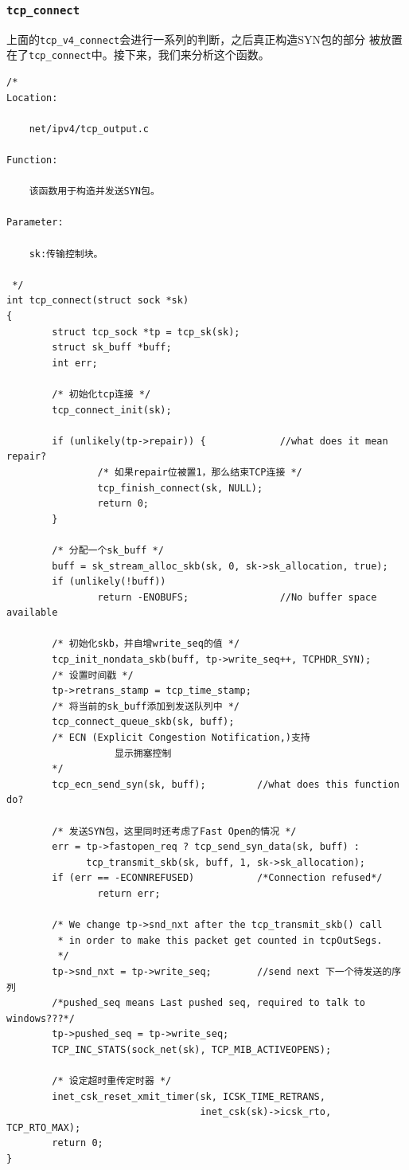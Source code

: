         \subsubsection{\texttt{tcp_connect}}
            上面的\texttt{tcp_v4_connect}会进行一系列的判断，之后真正构造SYN包的部分
            被放置在了\texttt{tcp_connect}中。接下来，我们来分析这个函数。

\begin{verbatim}
/* 
Location:

    net/ipv4/tcp_output.c

Function:

    该函数用于构造并发送SYN包。

Parameter:

    sk:传输控制块。

 */
int tcp_connect(struct sock *sk)
{
        struct tcp_sock *tp = tcp_sk(sk);
        struct sk_buff *buff;
        int err;

        /* 初始化tcp连接 */
        tcp_connect_init(sk);

        if (unlikely(tp->repair)) {             //what does it mean repair?
                /* 如果repair位被置1，那么结束TCP连接 */
                tcp_finish_connect(sk, NULL);
                return 0;
        }

        /* 分配一个sk_buff */
        buff = sk_stream_alloc_skb(sk, 0, sk->sk_allocation, true);
        if (unlikely(!buff))
                return -ENOBUFS;                //No buffer space available

        /* 初始化skb，并自增write_seq的值 */
        tcp_init_nondata_skb(buff, tp->write_seq++, TCPHDR_SYN);
        /* 设置时间戳 */
        tp->retrans_stamp = tcp_time_stamp;
        /* 将当前的sk_buff添加到发送队列中 */
        tcp_connect_queue_skb(sk, buff);
        /* ECN (Explicit Congestion Notification,)支持 
                   显示拥塞控制
        */
        tcp_ecn_send_syn(sk, buff);         //what does this function do?

        /* 发送SYN包，这里同时还考虑了Fast Open的情况 */
        err = tp->fastopen_req ? tcp_send_syn_data(sk, buff) :
              tcp_transmit_skb(sk, buff, 1, sk->sk_allocation);
        if (err == -ECONNREFUSED)           /*Connection refused*/
                return err;

        /* We change tp->snd_nxt after the tcp_transmit_skb() call
         * in order to make this packet get counted in tcpOutSegs.
         */
        tp->snd_nxt = tp->write_seq;        //send next 下一个待发送的序列
        /*pushed_seq means Last pushed seq, required to talk to windows???*/        
        tp->pushed_seq = tp->write_seq;
        TCP_INC_STATS(sock_net(sk), TCP_MIB_ACTIVEOPENS);

        /* 设定超时重传定时器 */
        inet_csk_reset_xmit_timer(sk, ICSK_TIME_RETRANS,
                                  inet_csk(sk)->icsk_rto, TCP_RTO_MAX);
        return 0;
}
\end{verbatim}

